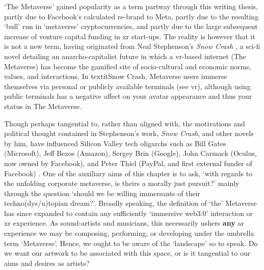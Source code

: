`The Metaverse' gained popularity as a term partway through this writing thesis, partly due to Facebook's calculated re-brand to Meta, partly due to the resulting `bull' run in `metaverse' cryptocurrencies, and partly due to the large subsequent increase of venture capital funding in \gls{xr} start-ups. The reality is however that it is not a new term, having originated from Neal Stephenson's \textit{Snow Crash} \citep[]{stephenson1992}, a sci-fi novel detailing an anarcho-capitalist future in which a \gls{vr}-based internet (The Metaverse) has become the gamified site of socio-cultural and economic norms, values, and interactions. In textit{Snow Crash}, Metaverse users immerse themselves via personal or publicly available terminals (see \gls{vr}), although using public terminals has a negative affect on your avatar appearance and thus your status in The Metaverse.

Though perhaps tangential to, rather than aligned with, the motivations and political thought contained in Stephenson's work, \textit{Snow Crash}, and other novels by him, have influenced Silicon Valley tech oligarchs such as Bill Gates (Microsoft), Jeff Bezos (Amazon), Sergey Brin (Google), John Carmack (Oculus, now owned by Facebook), and Peter Thiel (PayPal, and first external funder of Facebook) \citep[]{rogers2021}. One of the auxiliary aims of this chapter is to ask, `with regards to the unfolding corporate metaverse, is theirs a morally just pursuit?' mainly through the question `should we be willing immersants of their techno(dys/u)topian dream?'. Broadly speaking, the definition of `the' Metaverse has since expanded to contain any sufficiently `immersive web3.0' interaction or \gls{xr} experience. As sound-artists and musicians, this necessarily ushers \textbf{any} \gls{ar} experience we may be composing, performing, or developing under the umbrella term `Metaverse'. Hence, we ought to be aware of the `landscape' so to speak. Do we want our artwork to be associated with this space, or is it tangential to our aims and desires as artists?


